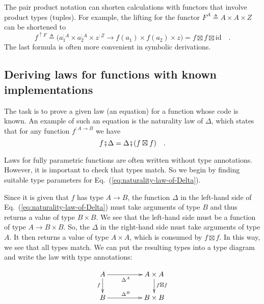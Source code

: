 The pair product notation can shorten calculations with functors that
involve product types (tuples). For example, the lifting for the functor
$F^{A}\triangleq A\times A\times Z$ can be shortened to
\[
f^{\uparrow F}\triangleq\big(a_{1}^{:A}\times a_{2}^{:A}\times z^{:Z}\rightarrow f(a_{1})\times f(a_{2})\times z\big)=f\boxtimes f\boxtimes\text{id}\quad.
\]
The last formula is often more convenient in symbolic derivations. 

\subsection{Deriving laws for functions with known implementations}

The task is to prove a given law (an equation) for a function whose
code is known. An example of such an equation is the naturality
law of $\Delta$, which states that for any function $f^{:A\rightarrow B}$
we have
\begin{equation}
f\bef\Delta=\Delta\bef(f\boxtimes f)\quad.\label{eq:naturality-law-of-Delta}
\end{equation}

Laws for fully parametric functions are often written without type
annotations. However, it is important to check that types match. So
we begin by finding suitable type parameters for Eq.~(\ref{eq:naturality-law-of-Delta}).

Since it is given that $f$ has type $A\rightarrow B$, the function
$\Delta$ in the left-hand side of Eq.~(\ref{eq:naturality-law-of-Delta})
must take arguments of type $B$ and thus returns a value of type
$B\times B$. We see that the left-hand side must be a function of
type $A\rightarrow B\times B$. So, the $\Delta$ in the right-hand
side must take arguments of type $A$. It then returns a value of
type $A\times A$, which is consumed by $f\boxtimes f$. In this way,
we see that all types match. We can put the resulting types into a
type diagram and write the law with type annotations:

\begin{wrapfigure}{L}{0.25\columnwidth}%
\vspace{-2\baselineskip}
\[
\xymatrix{\xyScaleY{1.6pc}\xyScaleX{4.0pc}A\ar[d]\sb(0.45){f}\ar[r]\sb(0.45){\Delta^{A}} & A\times A\ar[d]\sp(0.45){f\boxtimes f}\\
B\ar[r]\sp(0.45){\Delta^{B}} & B\times B
}
\]
\vspace{-0.1\baselineskip}
\end{wrapfigure}%


